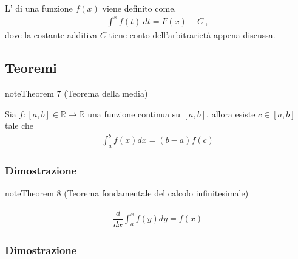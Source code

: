 \documentclass[letterpaper,10pt,english]{jupyterBook}
\begin{document}
\sphinxAtStartPar
L’ di una funzione \(f(x)\) viene definito come,
\begin{equation*}
\begin{split}\int^x f(t) \ dt = F(x) + C \ ,\end{split}
\end{equation*}
\sphinxAtStartPar
dove la costante additiva \(C\) tiene conto dell’arbitrarietà appena discussa.


\subsection{Teoremi}
\label{\detokenize{ch/infinitesimal_calculus/integrals:teoremi}}\label{\detokenize{ch/infinitesimal_calculus/integrals:infinitesimal-calculus-integrals-thm}}

\label{ch/infinitesimal_calculus/integrals:integrals:thm:avg}
\begin{sphinxadmonition}{note}{Theorem 7 (Teorema della media)}



\sphinxAtStartPar
Sia \(f: [a,b] \in \mathbb{R} \rightarrow \mathbb{R}\) una funzione continua su \([a,b]\), allora esiste \(c \in [a,b]\) tale che
\begin{equation*}
\begin{split}\int_{a}^{b} f(x) dx = (b-a) f(c) \end{split}
\end{equation*}\end{sphinxadmonition}
\subsubsection*{Dimostrazione}

\sphinxAtStartPar
{}


\label{ch/infinitesimal_calculus/integrals:integrals:thm:fund}
\begin{sphinxadmonition}{note}{Theorem 8 (Teorema fondamentale del calcolo infinitesimale)}


\begin{equation*}
\begin{split}\dfrac{d}{dx} \int_{a}^{x} f(y) dy = f(x) \end{split}
\end{equation*}\end{sphinxadmonition}
\subsubsection*{Dimostrazione}
\end{document}
